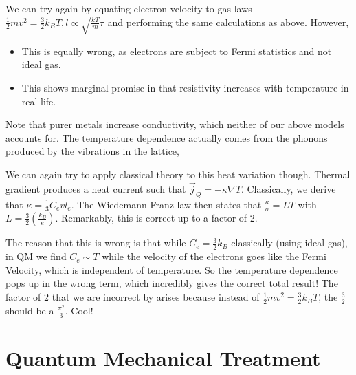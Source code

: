 \documentclass[10pt]{report}
\begin{document}
We can try again by equating electron velocity to gas laws $\frac{1}{2}mv^2 = \frac{3}{2}k_BT, l \propto \sqrt{\frac{kT}{m}\tau}$ and performing the same calculations as above. However,
\begin{itemize}
    \item This is equally wrong, as electrons are subject to Fermi statistics and not ideal gas.
    \item This shows marginal promise in that resistivity increases with temperature in real life.
\end{itemize}

Note that purer metals increase conductivity, which neither of our above models accounts for. The temperature dependence actually comes from the phonons produced by the vibrations in the lattice, 

We can again try to apply classical theory to this heat variation though. Thermal gradient produces a heat current such that $\vec{j}_Q = -\kappa \nabla T$. Classically, we derive that $\kappa = \frac{1}{3}C_evl_e$. The Wiedemann-Franz law then states that $\frac{\kappa}{\sigma} = LT$ with $L = \frac{3}{2}\left( \frac{k_B}{e} \right)$. Remarkably, this is correct up to a factor of $2$. 

The reason that this is wrong is that while $C_e = \frac{3}{2}k_B$ classically (using ideal gas), in QM we find $C_e \sim T$ while the velocity of the electrons goes like the Fermi Velocity, which is independent of temperature. So the temperature dependence pops up in the wrong term, which incredibly gives the correct total result! The factor of $2$ that we are incorrect by arises because instead of $\frac{1}{2}mv^2 = \frac{3}{2}k_BT$, the $\frac{3}{2}$ should be a $\frac{\pi^2}{3}$. Cool!

\section{Quantum Mechanical Treatment}
\end{document}
